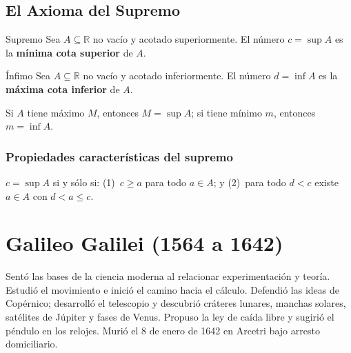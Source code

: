 \documentclass[12pt]{article}
\begin{document}
\subsection{El Axioma del Supremo}

\begin{definicion}[1.1]{Supremo}
Sea $A \subseteq \mathbb{R}$ no vacío y acotado superiormente. El número $c = \sup A$ es la \textbf{mínima cota superior} de $A$.
\end{definicion}

\begin{definicion}[1.2]{Ínfimo}
Sea $A \subseteq \mathbb{R}$ no vacío y acotado inferiormente. El número $d = \inf A$ es la \textbf{máxima cota inferior} de $A$.
\end{definicion}

Si $A$ tiene máximo $M$, entonces $M = \sup A$; si tiene mínimo $m$, entonces $m = \inf A$.

\subsubsection{Propiedades características del supremo}

$c = \sup A$ si y sólo si: (1)~$c \geq a$ para todo $a \in A$; y (2)~para todo $d < c$ existe $a \in A$ con $d < a \leq c$.

\section*{Galileo Galilei (1564 a 1642)}

Sentó las bases de la ciencia moderna al relacionar experimentación y teoría. Estudió el movimiento e inició el camino hacia el cálculo. Defendió las ideas de Copérnico; desarrolló el telescopio y descubrió cráteres lunares, manchas solares, satélites de Júpiter y fases de Venus. Propuso la ley de caída libre y sugirió el péndulo en los relojes. Murió el 8 de enero de 1642 en Arcetri bajo arresto domiciliario.

\end{document}
